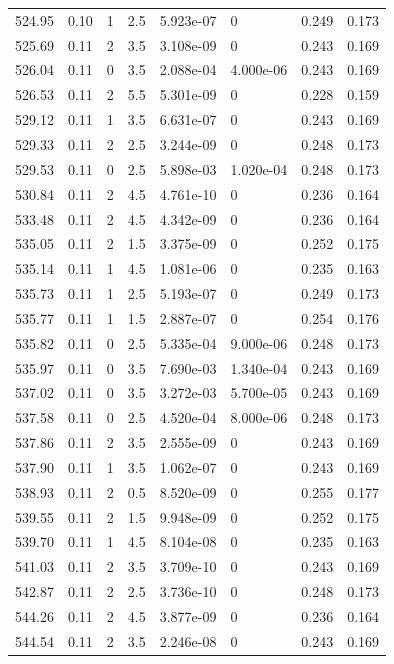 \documentclass[preview]{standalone}
\begin{document}
{{{{{{{{{\begin{tabular}{L{1.2cm}C{1.2cm} C{0.3cm}C{0.5cm} C{1.4cm}C{1.4cm} C{1.4cm}C{1.4cm}}
  524.95  &  0.10  & 1     & 2.5 &  5.923e-07  & 0  & 0.249 &  0.173   \\ 
  525.69  &  0.11  & 2     & 3.5 &  3.108e-09  & 0  & 0.243 &  0.169   \\ 
  526.04  &  0.11  & 0     & 3.5 &  2.088e-04  & 4.000e-06  & 0.243 &  0.169   \\ 
  526.53  &  0.11  & 2     & 5.5 &  5.301e-09  & 0  & 0.228 &  0.159   \\ 
  529.12  &  0.11  & 1     & 3.5 &  6.631e-07  & 0  & 0.243 &  0.169   \\ 
  529.33  &  0.11  & 2     & 2.5 &  3.244e-09  & 0  & 0.248 &  0.173   \\ 
  529.53  &  0.11  & 0     & 2.5 &  5.898e-03  & 1.020e-04  & 0.248 &  0.173   \\ 
  530.84  &  0.11  & 2     & 4.5 &  4.761e-10  & 0  & 0.236 &  0.164   \\ 
  533.48  &  0.11  & 2     & 4.5 &  4.342e-09  & 0  & 0.236 &  0.164   \\ 
  535.05  &  0.11  & 2     & 1.5 &  3.375e-09  & 0  & 0.252 &  0.175   \\ 
  535.14  &  0.11  & 1     & 4.5 &  1.081e-06  & 0  & 0.235 &  0.163   \\ 
  535.73  &  0.11  & 1     & 2.5 &  5.193e-07  & 0  & 0.249 &  0.173   \\ 
  535.77  &  0.11  & 1     & 1.5 &  2.887e-07  & 0  & 0.254 &  0.176   \\ 
  535.82  &  0.11  & 0     & 2.5 &  5.335e-04  & 9.000e-06  & 0.248 &  0.173   \\ 
  535.97  &  0.11  & 0     & 3.5 &  7.690e-03  & 1.340e-04  & 0.243 &  0.169   \\ 
  537.02  &  0.11  & 0     & 3.5 &  3.272e-03  & 5.700e-05  & 0.243 &  0.169   \\ 
  537.58  &  0.11  & 0     & 2.5 &  4.520e-04  & 8.000e-06  & 0.248 &  0.173   \\ 
  537.86  &  0.11  & 2     & 3.5 &  2.555e-09  & 0  & 0.243 &  0.169   \\ 
  537.90  &  0.11  & 1     & 3.5 &  1.062e-07  & 0  & 0.243 &  0.169   \\ 
  538.93  &  0.11  & 2     & 0.5 &  8.520e-09  & 0  & 0.255 &  0.177   \\ 
  539.55  &  0.11  & 2     & 1.5 &  9.948e-09  & 0  & 0.252 &  0.175   \\ 
  539.70  &  0.11  & 1     & 4.5 &  8.104e-08  & 0  & 0.235 &  0.163   \\ 
  541.03  &  0.11  & 2     & 3.5 &  3.709e-10  & 0  & 0.243 &  0.169   \\ 
  542.87  &  0.11  & 2     & 2.5 &  3.736e-10  & 0  & 0.248 &  0.173   \\ 
  544.26  &  0.11  & 2     & 4.5 &  3.877e-09  & 0  & 0.236 &  0.164   \\ 
  544.54  &  0.11  & 2     & 3.5 &  2.246e-08  & 0  & 0.243 &  0.169   \\ 
\hline 
\end{tabular} 

}}}}}}}}}
\end{document}
